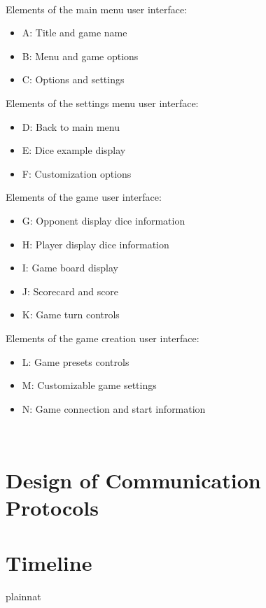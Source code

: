 \documentclass[12pt, titlepage]{article}
\begin{document}
~
\newpage
~
\newpage

\noindent
Elements of the main menu user interface:
\begin{itemize}
  \item A: Title and game name
  \item B: Menu and game options
  \item C: Options and settings
\end{itemize}
Elements of the settings menu user interface:
\begin{itemize}
  \item D: Back to main menu
  \item E: Dice example display
  \item F: Customization options
\end{itemize}
Elements of the game user interface:
\begin{itemize}
  \item G: Opponent display dice information
  \item H: Player display dice information
  \item I: Game board display
  \item J: Scorecard and score
  \item K: Game turn controls
\end{itemize}
Elements of the game creation user interface:
\begin{itemize}
  \item L: Game presets controls
  \item M: Customizable game settings
  \item N: Game connection and start information
\end{itemize}









~\newpage
\section{Design of Communication Protocols}


\section{Timeline}



 {plainnat}


\newpage{}
\end{document}
